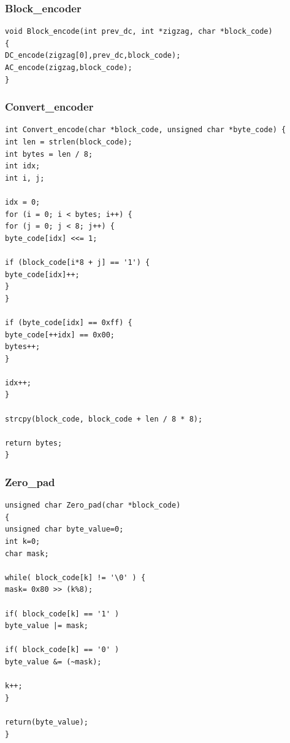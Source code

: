 \documentclass[paper=a4, fontsize=11pt]{scrartcl} %
\numberwithin{equation}{section} %
\numberwithin{figure}{section} %
\numberwithin{table}{section} %
\begin{document}
\subsubsection{Block\_encoder}
\begin{lstlisting}
void Block_encode(int prev_dc, int *zigzag, char *block_code)
{
DC_encode(zigzag[0],prev_dc,block_code);
AC_encode(zigzag,block_code);
}
\end{lstlisting}

\subsubsection{Convert\_encoder}
\begin{lstlisting}
int Convert_encode(char *block_code, unsigned char *byte_code) {
int len = strlen(block_code);
int bytes = len / 8;
int idx;
int i, j;

idx = 0;
for (i = 0; i < bytes; i++) {
for (j = 0; j < 8; j++) {
byte_code[idx] <<= 1;

if (block_code[i*8 + j] == '1') {
byte_code[idx]++;
}
}

if (byte_code[idx] == 0xff) {
byte_code[++idx] == 0x00;
bytes++;
}

idx++;
}

strcpy(block_code, block_code + len / 8 * 8);

return bytes;
}
\end{lstlisting}

\subsubsection{Zero\_pad}
\begin{lstlisting}
unsigned char Zero_pad(char *block_code)
{
unsigned char byte_value=0;
int k=0;
char mask;

while( block_code[k] != '\0' ) {
mask= 0x80 >> (k%8);         

if( block_code[k] == '1' )
byte_value |= mask;         

if( block_code[k] == '0' )
byte_value &= (~mask);      

k++;
}

return(byte_value);
}  
\end{lstlisting}
\end{document}
